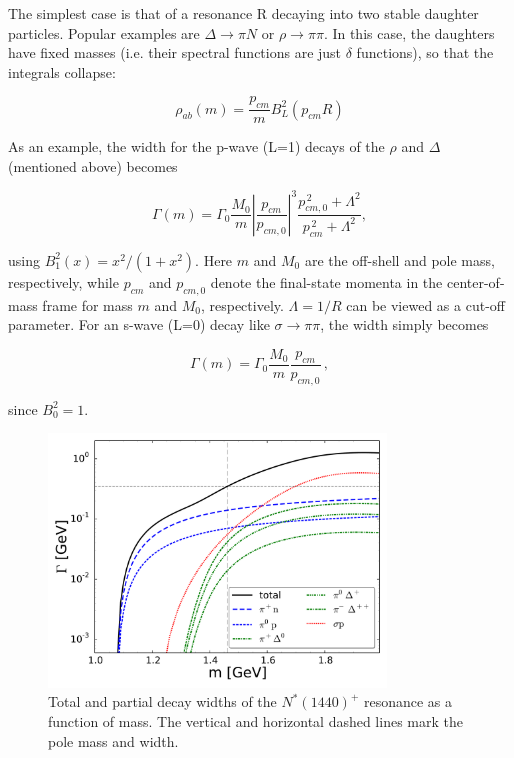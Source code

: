 The simplest case is that of a resonance R decaying into two stable daughter
particles. Popular examples are $\Delta\rightarrow\pi N$ or
$\rho\rightarrow\pi\pi$. In this case, the daughters have fixed masses (i.e.
their spectral functions are just $\delta$ functions), so that the integrals
collapse:

\begin{equation}
  \rho_{ab}(m) = \frac{p_{cm}}{m} B_L^2(p_{cm} R)
\end{equation}

As an example, the width for the p-wave (L=1) decays of the $\rho$ and $\Delta$
(mentioned above) becomes

\begin{equation}
  \Gamma(m) = \Gamma_0 \frac{M_0}{m} \left|\frac{p_{cm}}{p_{cm,0}}\right|^3
              \frac{p_{cm,0}^{\,2}+\Lambda^2}{p_{cm}^{\,2}+\Lambda^2},
\end{equation}

using $B_1^2(x)=x^2/(1+x^2)$. Here $m$ and $M_0$ are the off-shell and pole
mass, respectively, while $p_{cm}$ and $p_{cm,0}$ denote the
final-state momenta in the center-of-mass frame for mass $m$ and $M_0$,
respectively. $\Lambda=1/R$ can be viewed as a cut-off parameter. For an s-wave
(L=0) decay like $\sigma\rightarrow\pi\pi$, the width simply becomes

\begin{equation}
  \Gamma(m) = \Gamma_0 \frac{M_0}{m} \frac{p_{cm}}{p_{cm,0}} \,,
\end{equation}

since $B_0^2=1$.

\begin{figure}
  \centering
  \includegraphics[width=0.8\textwidth]{plots/smash/width.pdf}
  \caption{Total and partial decay widths of the $N^*(1440)^+$ resonance
           as a function of mass. The vertical and horizontal dashed lines
           mark the pole mass and width.}
  \label{fig:width}
\end{figure}


